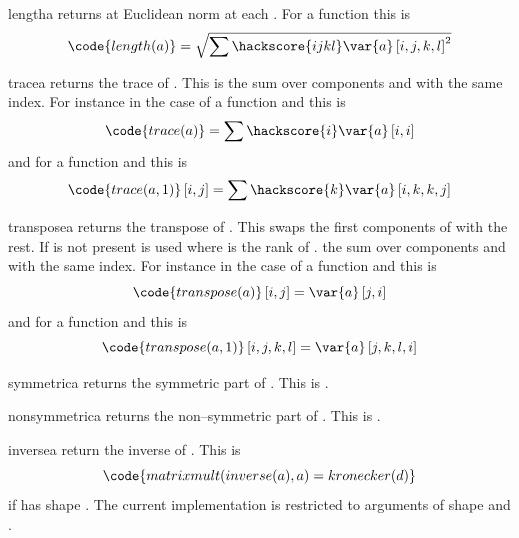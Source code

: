 \begin{funcdesc}{length}{a}
returns at Euclidean norm at each \DataSamplePoints. For a \RankFour function  this is
\begin{equation}
\code{length(a)}=\sqrt{\sum\hackscore{ijkl} \var{a} \left[i,j,k,l\right]^2}
\end{equation} 
\end{funcdesc}
\begin{funcdesc}{trace}{a}
returns the trace of . This is the sum over components  and  with the same index. For instance in the
case of a \RankTwo function and this is 
\begin{equation}
\code{trace(a)}=\sum\hackscore{i} \var{a} \left[i,i\right]
\end{equation} 
and for a \RankFour function and   this is
\begin{equation}
\code{trace(a,1)}\left[i,j\right]=\sum\hackscore{k} \var{a} \left[i,k,k,j\right]
\end{equation} 
\end{funcdesc}
\begin{funcdesc}{transpose}{a}
returns the transpose of . This swaps the first  components of  with the rest. If  is not
present  is used where  is the rank of . 
 the sum over components  and  with the same index. For instance in the
case of a \RankTwo function and this is 
\begin{equation}
\code{transpose(a)}\left[i,j\right]=\var{a} \left[j,i\right]
\end{equation} 
and for a \RankFour function and   this is
\begin{equation}
\code{transpose(a,1)}\left[i,j,k,l\right]=\var{a} \left[j,k,l,i\right]
\end{equation} 
\end{funcdesc}
\begin{funcdesc}{symmetric}{a}
returns the symmetric part of . This is .
\end{funcdesc}
\begin{funcdesc}{nonsymmetric}{a}
returns the non--symmetric part of . This is .
\end{funcdesc}
\begin{funcdesc}{inverse}{a}
return the inverse of . This is 
\begin{equation}
\code{matrixmult(inverse(a),a)=kronecker(d)}
\end{equation} 
if  has shape . The current implementation is restricted to arguments of shape 
 and .
\end{funcdesc}
